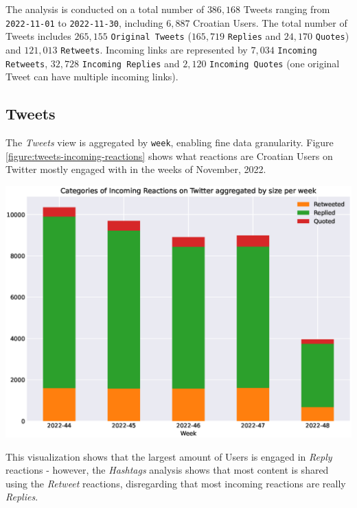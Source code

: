 The analysis is conducted on a total number of \(386,168\) Tweets ranging from \texttt{2022-11-01} to \texttt{2022-11-30}, including \(6,887\) Croatian Users. The total number of Tweets includes \(265,155\) \texttt{Original Tweets} (\(165,719\) \texttt{Replies} and \(24,170\) \texttt{Quotes}) and \(121,013\) \texttt{Retweets}. Incoming links are represented by \(7,034\) \texttt{Incoming Retweets}, \(32,728\) \texttt{Incoming Replies} and \(2,120\) \texttt{Incoming Quotes} (one original Tweet can have multiple incoming links).

\subsection{Tweets}
\label{sec:results-tweets}

The \textit{Tweets} view is aggregated by \texttt{week}, enabling fine data granularity. Figure \ref{figure:tweets-incoming-reactions} shows what reactions are Croatian Users on Twitter mostly engaged with in the weeks of November, 2022.

\begin{center}
\includegraphics[width=14cm,keepaspectratio]{figures/tweets-incoming-reactions.eps}
\label{figure:tweets-incoming-reactions}
\end{center}

This visualization shows that the largest amount of Users is engaged in \textit{Reply} reactions - however, the \textit{Hashtags} analysis shows that most content is shared using the \textit{Retweet} reactions, disregarding that most incoming reactions are really \textit{Replies}.

